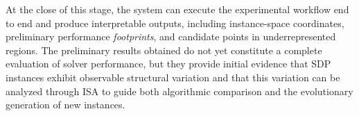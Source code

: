 At the close of this stage, the system can execute the experimental workflow end to end
and produce interpretable outputs, including instance-space coordinates, preliminary
performance \textit{footprints}, and candidate points in underrepresented regions. The
preliminary results obtained do not yet constitute a complete evaluation of solver
performance, but they provide initial evidence that SDP instances exhibit observable
structural variation and that this variation can be analyzed through ISA to guide both
algorithmic comparison and the evolutionary generation of new instances.

\normalsize
